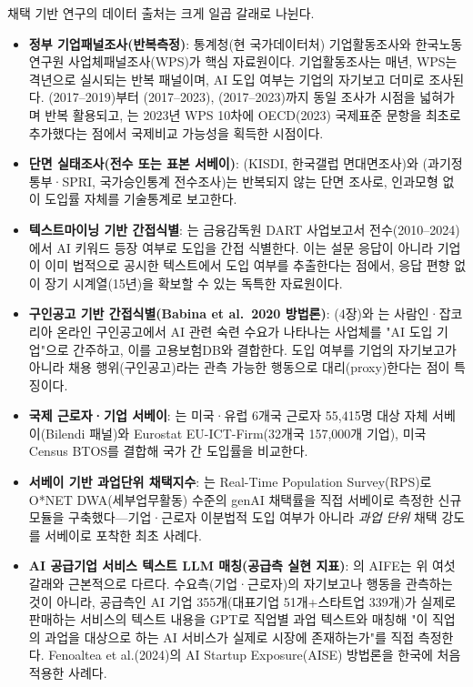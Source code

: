 \documentclass[11pt]{article}
\begin{document}
채택 기반 연구의 데이터 출처는 크게 일곱 갈래로 나뉜다.

\begin{itemize}[leftmargin=*]
  \item \textbf{정부 기업패널조사(반복측정)}: 통계청(현 국가데이터처) 기업활동조사와 한국노동연구원 사업체패널조사(WPS)가 핵심 자료원이다. 기업활동조사는 매년, WPS는 격년으로 실시되는 반복 패널이며, AI 도입 여부는 기업의 자기보고 더미로 조사된다. \citet{kiet-2021-ai-adoption-productivity}(2017--2019)부터 \citet{kim-2025-ai-adoption-firm-performance}(2017--2023), \citet{nam-2026-ai-macroeconomic-impact-analysis}(2017--2023)까지 동일 조사가 시점을 넓혀가며 반복 활용되고, \citet{lee-2025-ai-adoption-determinants-performance}는 2023년 WPS 10차에 OECD(2023) 국제표준 문항을 최초로 추가했다는 점에서 국제비교 가능성을 획득한 시점이다.
  \item \textbf{단면 실태조사(전수 또는 표본 서베이)}: \citet{kim-2021-ai-adoption-status-major-industries}(KISDI, 한국갤럽 면대면조사)와 \citet{spri-2024-ai-industry-survey}(과기정통부·SPRI, 국가승인통계 전수조사)는 반복되지 않는 단면 조사로, 인과모형 없이 도입률 자체를 기술통계로 보고한다.
  \item \textbf{텍스트마이닝 기반 간접식별}: \citet{seo-2025-ai-adoption-characteristics-business-reports}는 금융감독원 DART 사업보고서 전수(2010--2024)에서 AI 키워드 등장 여부로 도입을 간접 식별한다. 이는 설문 응답이 아니라 기업이 이미 법적으로 공시한 텍스트에서 도입 여부를 추출한다는 점에서, 응답 편향 없이 장기 시계열(15년)을 확보할 수 있는 독특한 자료원이다.
  \item \textbf{구인공고 기반 간접식별(Babina et al.\ 2020 방법론)}: \citet{chang-2024-ai-development-employment-effects}(4장)와 \citet{noh-2025-ai-based-manufacturing-innovation-employment}는 사람인·잡코리아 온라인 구인공고에서 AI 관련 숙련 수요가 나타나는 사업체를 "AI 도입 기업"으로 간주하고, 이를 고용보험DB와 결합한다. 도입 여부를 기업의 자기보고가 아니라 채용 행위(구인공고)라는 관측 가능한 행동으로 대리(proxy)한다는 점이 특징이다.
  \item \textbf{국제 근로자·기업 서베이}: \citet{bick-2026-mind-the-gap-ai-adoption}는 미국·유럽 6개국 근로자 55,415명 대상 자체 서베이(Bilendi 패널)와 Eurostat EU-ICT-Firm(32개국 157,000개 기업), 미국 Census BTOS를 결합해 국가 간 도입률을 비교한다.
  \item \textbf{서베이 기반 과업단위 채택지수}: \citet{bick-2026-what-work-does-generative}는 Real-Time Population Survey(RPS)로 O*NET DWA(세부업무활동) 수준의 genAI 채택률을 직접 서베이로 측정한 신규 모듈을 구축했다—기업·근로자 이분법적 도입 여부가 아니라 \emph{과업 단위} 채택 강도를 서베이로 포착한 최초 사례다.
  \item \textbf{AI 공급기업 서비스 텍스트 LLM 매칭(공급측 실현 지표)}: \citet{cheon-2025-ai-exposure-vs-ai-adoption}의 AIFE는 위 여섯 갈래와 근본적으로 다르다. 수요측(기업·근로자)의 자기보고나 행동을 관측하는 것이 아니라, 공급측인 AI 기업 355개(대표기업 51개+스타트업 339개)가 실제로 판매하는 서비스의 텍스트 내용을 GPT로 직업별 과업 텍스트와 매칭해 "이 직업의 과업을 대상으로 하는 AI 서비스가 실제로 시장에 존재하는가"를 직접 측정한다. Fenoaltea et al.(2024)의 AI Startup Exposure(AISE) 방법론을 한국에 처음 적용한 사례다.
\end{itemize}
\end{document}
